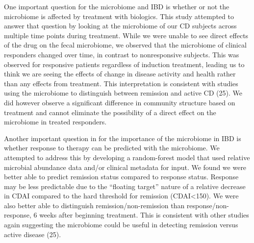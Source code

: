 \documentclass[11pt,]{article}
\begin{document}
One important question for the microbiome and IBD is whether or not the
microbiome is affected by treatment with biologics. This study attempted
to answer that question by looking at the microbiome of our CD subjects
across multiple time points during treatment. While we were unable to
see direct effects of the drug on the fecal microbiome, we observed that
the microbiome of clinical responders changed over time, in contrast to
nonresponsive subjects. This was observed for responsive patients
regardless of induction treatment, leading us to think we are seeing the
effects of change in disease activity and health rather than any effects
from treatment. This interpretation is consistent with studies using the
microbiome to distinguish between remission and active CD (25). We did
however observe a significant difference in community structure based on
treatment and cannot eliminate the possibility of a direct effect on the
microbiome in treated responders.

Another important question in for the importance of the microbiome in
IBD is whether response to therapy can be predicted with the microbiome.
We attempted to address this by developing a random-forest model that
used relative microbial abundance data and/or clinical metadata for
input. We found we were better able to predict remission status compared
to response status. Response may be less predictable due to the
``floating target'' nature of a relative decrease in CDAI compared to
the hard threshold for remission (CDAI\textless{}150). We were also
better able to distinguish remission/non-remission than
response/non-response, 6 weeks after beginning treatment. This is
consistent with other studies again suggesting the microbiome could be
useful in detecting remission versus active disease (25).
\end{document}
